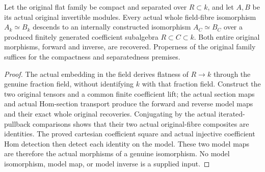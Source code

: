 \begin{theorem}
\label{thm:kn-arithmetic-original-line-power-iso}
\leanok
{}
Let the original flat family be compact and separated over $R\subset k$,
and let $A,B$ be its actual original invertible modules. Every actual whole
field-fibre isomorphism $A_k\simeq B_k$ descends to an internally constructed
isomorphism $A_C\simeq B_C$ over a produced finitely generated coefficient
subalgebra $R\subset C\subset k$. Both entire original morphisms, forward
and inverse, are recovered. Properness of the original family suffices for
the compactness and separatedness premises.
\end{theorem}

\begin{proof}
The actual embedding in the field derives flatness of $R\to k$ through
the genuine fraction field, without identifying $k$ with that fraction field.
Construct the two original tensors and a common finite coefficient lift;
the actual section maps and actual Hom-section transport produce the forward
and reverse model maps and their exact whole original recoveries.
Conjugating by the actual iterated-pullback comparisons shows that their
two actual original-fibre composites are identities. The proved cartesian
coefficient square and actual injective coefficient Hom detection then
detect each identity on the model. These two model maps are therefore the
actual morphisms of a genuine isomorphism. No model isomorphism, model map,
or model inverse is a supplied input.
\end{proof}


